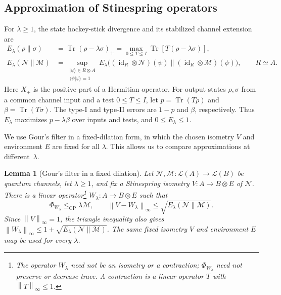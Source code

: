 \documentclass[11pt,letterpaper]{article}
\numberwithin{equation}{section}
\newtheorem{lemma}[theorem]{Lemma}
\newcommand{\N}{\mathcal N}
\newcommand{\M}{\mathcal M}
\newcommand{\id}{\operatorname{id}}
\newcommand{\Tr}{\operatorname{Tr}}
\newcommand{\cp}{\mathrm{CP}}
\newcommand{\cL}{\mathcal L}
\newcommand{\norm}[1]{\left\lVert#1\right\rVert}
\begin{document}
\subsection{Approximation of Stinespring operators}\label{sec:filter}
For $\lambda\ge1$, the state hockey-stick divergence \cite{SW} and its stabilized channel extension \cite{Gour} are
\begin{align}
 E_\lambda(\rho\|\sigma)
 &=\Tr(\rho-\lambda\sigma)_+
 =\max_{0\le T\le I}\Tr[T(\rho-\lambda\sigma)],\label{eq:hstate}\\
 E_\lambda(\N\|\M)
 &=\sup_{\substack{|\psi\rangle\in R\otimes A\\\langle\psi|\psi\rangle=1}}
 E_\lambda\bigl((\id_R\otimes\N)(\psi)\|
                    (\id_R\otimes\M)(\psi)\bigr),\qquad R\simeq A.
 \label{eq:hchannel}
\end{align}
Here $X_+$ is the positive part of a Hermitian operator. For output states $\rho,\sigma$ from a common channel input and a test $0\le T\le I$, let $p=\Tr(T\rho)$ and $\beta=\Tr(T\sigma)$. The type-I and type-II errors are $1-p$ and $\beta$, respectively. Thus $E_\lambda$ maximizes $p-\lambda\beta$ over inputs and tests, and $0\le E_\lambda\le1$.

We use Gour's filter \cite[Eqs.~(44)--(49)]{Gour} in a fixed-dilation form, in which the chosen isometry $V$ and environment $E$ are fixed for all $\lambda$. This allows us to compare approximations at different~$\lambda$.

\begin{samepage}
\begin{lemma}[Gour's filter in a fixed dilation]\label{lem:filter}
Let $\N,\M:\cL(A)\to\cL(B)$ be quantum channels, let $\lambda\ge1$, and fix a Stinespring isometry $V:A\to B\otimes E$ of $\N$. There is a linear operator\footnote{The operator $W_\lambda$ need not be an isometry or a contraction; $\Phi_{W_\lambda}$ need not preserve or decrease trace. A contraction is a linear operator $T$ with $\norm{T}_\infty\le1$.} $W_\lambda:A\to B\otimes E$ such that
\begin{equation}\label{eq:filter}
 \Phi_{W_\lambda}\le_{\cp}\lambda\M,\qquad
 \norm{V-W_\lambda}_\infty\le\sqrt{E_\lambda(\N\|\M)}.
\end{equation}
Since $\norm V_\infty=1$, the triangle inequality also gives
$\norm{W_\lambda}_\infty\le1+\sqrt{E_\lambda(\N\|\M)}$.
The same fixed isometry $V$ and environment $E$ may be used for every $\lambda$.
\end{lemma}
\end{samepage}
\end{document}

